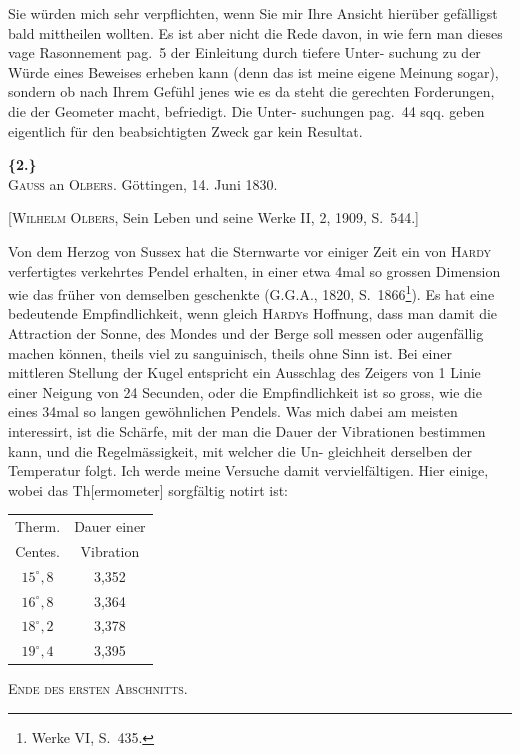 \documentclass[12pt,a4paper]{article}
\theoremstyle{plain}
\theoremstyle{definition}
\theoremstyle{remark}
\begin{document}
Sie w\"urden mich sehr verpflichten, wenn Sie mir Ihre Ansicht hier\"uber
gef\"alligst bald mittheilen wollten. Es ist aber nicht die Rede davon, in wie
fern man dieses vage Rasonnement pag.~5 der Einleitung durch tiefere Unter-
suchung zu der W\"urde eines Beweises erheben kann (denn das ist meine eigene
Meinung sogar), sondern ob nach Ihrem Gef\"uhl jenes wie es da steht die
gerechten Forderungen, die der Geometer macht, befriedigt. Die Unter-
suchungen pag.~44 sqq. geben eigentlich f\"ur den beabsichtigten Zweck gar
kein Resultat.

\vspace{0.5cm}

\noindent\textbf{\{2.\}}\\
\textsc{Gauss} an \textsc{Olbers}. G\"ottingen, 14. Juni 1830.

\vspace{0.2cm}
{\small[\textsc{Wilhelm Olbers}, Sein Leben und seine Werke II, 2, 1909, S.~544.]}

\vspace{0.3cm}

Von dem Herzog von Sussex hat die Sternwarte vor einiger Zeit ein von
\textsc{Hardy} verfertigtes verkehrtes Pendel erhalten, in einer etwa 4mal so grossen
Dimension wie das fr\"uher von demselben geschenkte (G.G.A., 1820, S.~1866\footnote{Werke VI, S.~435.}).
Es hat eine bedeutende Empfindlichkeit, wenn gleich \textsc{Hardy}s Hoffnung, dass
man damit die Attraction der Sonne, des Mondes und der Berge soll messen
oder augenf\"allig machen k\"onnen, theils viel zu sanguinisch, theils ohne Sinn
ist. Bei einer mittleren Stellung der Kugel entspricht ein Ausschlag des
Zeigers von 1 Linie einer Neigung von 24 Secunden, oder die Empfindlichkeit
ist so gross, wie die eines 34mal so langen gew\"ohnlichen Pendels. Was mich
dabei am meisten interessirt, ist die Sch\"arfe, mit der man die Dauer der
Vibrationen bestimmen kann, und die Regelm\"assigkeit, mit welcher die Un-
gleichheit derselben der Temperatur folgt. Ich werde meine Versuche damit
vervielf\"altigen. Hier einige, wobei das Th[ermometer] sorgf\"altig notirt ist:

\begin{center}
\begin{tabular}{c|c}
Therm. & Dauer einer \\
Centes. & Vibration \\
\hline
$15^{\circ},8$ & 3,352 \\
$16^{\circ},8$ & 3,364 \\
$18^{\circ},2$ & 3,378 \\
$19^{\circ},4$ & 3,395 \\
\end{tabular}
\end{center}

\vspace{1cm}

\begin{center}
{\large\textsc{Ende des ersten Abschnitts.}}
\end{center}
\end{document}
